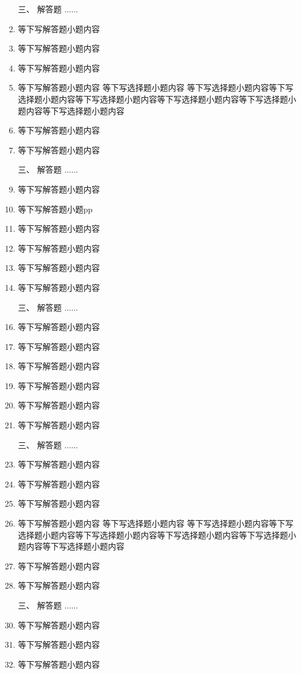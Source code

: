 \documentclass[12pt,twocolumn,landscape,UTF8,twoside]{ctexart}
\begin{document}
\begin{spacing}{1.3}
\begin{enumerate} [1、]
		\item[\heiti 三、] {\heiti 解答题  ......}
		\item 等下写解答题小题内容 
		\item 等下写解答题小题内容 
		\item 等下写解答题小题内容 
		\item 等下写解答题小题内容 等下写选择题小题内容 等下写选择题小题内容等下写选择题小题内容等下写选择题小题内容等下写选择题小题内容等下写选择题小题内容等下写选择题小题内容
		\item 等下写解答题小题内容 
		\item 等下写解答题小题内容  		
		\item[\heiti 三、] {\heiti 解答题  ......}
		\item 等下写解答题小题内容 
		\item 等下写解答题小题pp
		\item 等下写解答题小题内容 \pd
		\item 等下写解答题小题内容 \pd
		\item 等下写解答题小题内容 \pd
		\item 等下写解答题小题内容  		\pd
		\item[\heiti 三、] {\heiti 解答题  ......}
		\item 等下写解答题小题内容 \pd
		\item 等下写解答题小题内容 \pd
		\item 等下写解答题小题内容 \pd
		\item 等下写解答题小题内容 \pd
		\item 等下写解答题小题内容 \pd
		\item 等下写解答题小题内容  		\pd
		\item[\heiti 三、] {\heiti 解答题  ......}
		\item 等下写解答题小题内容 
		\item 等下写解答题小题内容 
		\item 等下写解答题小题内容 
		\item 等下写解答题小题内容 等下写选择题小题内容 等下写选择题小题内容等下写选择题小题内容等下写选择题小题内容等下写选择题小题内容等下写选择题小题内容等下写选择题小题内容
		\item 等下写解答题小题内容 
		\item 等下写解答题小题内容  		
		\item[\heiti 三、] {\heiti 解答题  ......}
		\item 等下写解答题小题内容 
		\item 等下写解答题小题内容 
		\item 等下写解答题小题内容 

\end{enumerate}
\end{spacing}
\end{document}
